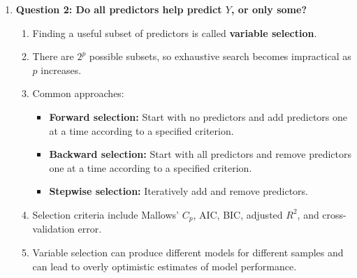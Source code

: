 \documentclass{article}
\begin{document}
\begin{enumerate}
\begin{enumerate}
\item Since

$$
TSS=SSR+RSS,
$$
where
\[
SSR=\sum(\hat y_i-\bar y)^2,\qquad
\]

the $F$-statistic can also be written

$$
F=
\frac{SSR/p}{RSS/(n-p-1)}.
$$

It compares explained variation per predictor to unexplained variation per residual degree of freedom.

\item Under $H_0$,

$$
F\sim F_{p,n-p-1}.
$$

Large values of $F$ provide evidence against $H_0$.

\item $t$-statistics and $p$-values can also be calculated for individual coefficients:

$$
t_j=\frac{\hat{\beta}_j}{SE(\hat{\beta}_j)}.
$$

\end{enumerate}

\item \textbf{Question 2: Do all predictors help predict $Y$, or only some?}
\begin{enumerate}
\item Finding a useful subset of predictors is called \textbf{variable selection}.

\item There are $2^p$ possible subsets, so exhaustive search becomes impractical as $p$ increases.

\item Common approaches:
\begin{itemize}
\item \textbf{Forward selection:} Start with no predictors and add predictors one at a time according to a specified criterion.
\item \textbf{Backward selection:} Start with all predictors and remove predictors one at a time according to a specified criterion.
\item \textbf{Stepwise selection:} Iteratively add and remove predictors.
\end{itemize}

\item Selection criteria include Mallows' $C_p$, AIC, BIC, adjusted $R^2$, and cross-validation error.

\item Variable selection can produce different models for different samples and can lead to overly optimistic estimates of model performance.
\end{enumerate}


\end{enumerate}
\end{document}
